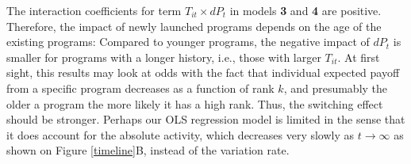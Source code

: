 The interaction coefficients for term $T_{it} \times dP_t$ in models {\bf 3} and {\bf 4} are positive. Therefore, the impact of newly launched programs depends on the age of the existing programs: Compared to younger programs, the negative impact of $dP_t$ is smaller for programs with a longer history, i.e., those with larger $T_{it}$. At first sight, this results may look at odds with the fact that individual expected payoff from a specific program decreases as a function of rank $k$, and presumably the older a program the more likely it has a high rank. Thus, the switching effect should be stronger. Perhaps our OLS regression model is limited in the sense that it does account for the absolute activity, which decreases very slowly as $t \rightarrow \infty$ as shown on Figure \ref{timeline}B, instead of the variation rate.

